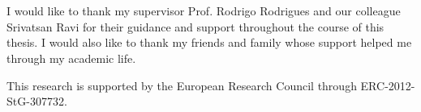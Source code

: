 
\section*{\acknowledgments}


I would like to thank my supervisor Prof. Rodrigo Rodrigues and our colleague Srivatsan Ravi for their guidance and support throughout the course of this thesis. I would also like to thank my friends and family whose support helped me through my academic life.\par
This research is supported by the European Research Council through ERC-2012-StG-307732.
